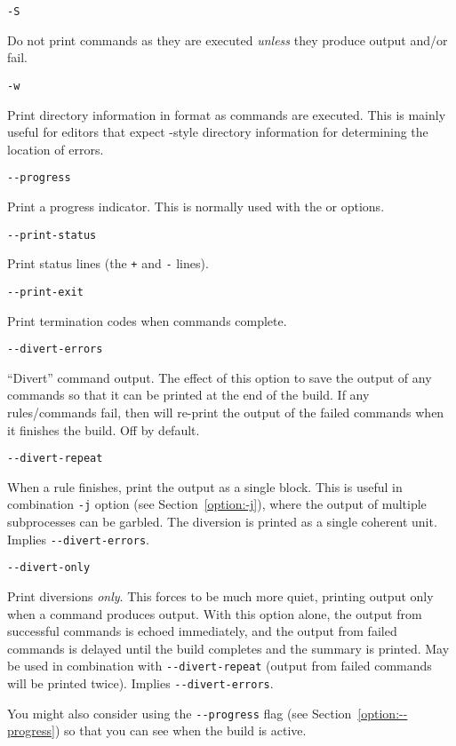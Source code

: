  \verb+-S+

Do not print commands as they are executed \emph{unless} they produce output and/or
fail.

 \verb+-w+

Print directory information in  format as commands are executed.
This is mainly useful for editors that expect -style
directory information for determining the location of errors.

 \verb+--progress+

Print a progress indicator.
This is normally used with the  or  options.

 \verb+--print-status+

Print status lines (the \verb/+/ and \verb/-/ lines).

 \verb+--print-exit+

Print termination codes when commands complete.

 \verb+--divert-errors+

``Divert'' command output.  The effect of this option to save the output of any commands so that it
can be printed at the end of the build.  If any rules/commands fail, then \OMake{} will re-print the
output of the failed commands when it finishes the build.  Off by default.

 \verb+--divert-repeat+

When a rule finishes, print the output as a single block.  This is useful
in combination \verb+-j+ option (see Section~\ref{option:-j}), where the output of multiple subprocesses can be
garbled.  The diversion is printed as a single coherent unit.  Implies \verb+--divert-errors+.

 \verb+--divert-only+ 

Print diversions \emph{only}.  This forces \OMake{} to be much more quiet,
printing output only when a command produces output.  With this option alone, the output from
successful commands is echoed immediately, and the output from failed commands is delayed until the
build completes and the summary is printed.  May be used in combination with \verb+--divert-repeat+
(output from failed commands will be printed twice).  Implies \verb+--divert-errors+.

You might also consider using the \verb+--progress+ flag (see Section~\ref{option:--progress}) so that you can see
when the build is active.

